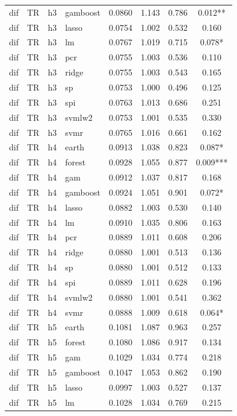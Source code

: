 \begin{ThreePartTable}
\begin{longtable}[t]{llclcccc}
dif & TR & h3 & gamboost & 0.0860 & 1.143 & 0.786 & 0.012**\\
dif & TR & h3 & lasso & 0.0754 & 1.002 & 0.532 & 0.160\\
dif & TR & h3 & lm & 0.0767 & 1.019 & 0.715 & 0.078*\\
dif & TR & h3 & pcr & 0.0755 & 1.003 & 0.536 & 0.110\\
dif & TR & h3 & ridge & 0.0755 & 1.003 & 0.543 & 0.165\\
dif & TR & h3 & sp & 0.0753 & 1.000 & 0.496 & 0.125\\
dif & TR & h3 & spi & 0.0763 & 1.013 & 0.686 & 0.251\\
dif & TR & h3 & svmlw2 & 0.0753 & 1.001 & 0.535 & 0.330\\
dif & TR & h3 & svmr & 0.0765 & 1.016 & 0.661 & 0.162\\
\addlinespace
dif & TR & h4 & earth & 0.0913 & 1.038 & 0.823 & 0.087*\\
dif & TR & h4 & forest & 0.0928 & 1.055 & 0.877 & 0.009***\\
dif & TR & h4 & gam & 0.0912 & 1.037 & 0.817 & 0.168\\
dif & TR & h4 & gamboost & 0.0924 & 1.051 & 0.901 & 0.072*\\
dif & TR & h4 & lasso & 0.0882 & 1.003 & 0.530 & 0.140\\
dif & TR & h4 & lm & 0.0910 & 1.035 & 0.806 & 0.163\\
dif & TR & h4 & pcr & 0.0889 & 1.011 & 0.608 & 0.206\\
dif & TR & h4 & ridge & 0.0880 & 1.001 & 0.513 & 0.136\\
dif & TR & h4 & sp & 0.0880 & 1.001 & 0.512 & 0.133\\
dif & TR & h4 & spi & 0.0889 & 1.011 & 0.628 & 0.196\\
dif & TR & h4 & svmlw2 & 0.0880 & 1.001 & 0.541 & 0.362\\
dif & TR & h4 & svmr & 0.0888 & 1.009 & 0.618 & 0.064*\\
\addlinespace
dif & TR & h5 & earth & 0.1081 & 1.087 & 0.963 & 0.257\\
dif & TR & h5 & forest & 0.1080 & 1.086 & 0.917 & 0.134\\
dif & TR & h5 & gam & 0.1029 & 1.034 & 0.774 & 0.218\\
dif & TR & h5 & gamboost & 0.1047 & 1.053 & 0.862 & 0.190\\
dif & TR & h5 & lasso & 0.0997 & 1.003 & 0.527 & 0.137\\
dif & TR & h5 & lm & 0.1028 & 1.034 & 0.769 & 0.215\\

\end{longtable}
\end{ThreePartTable}
